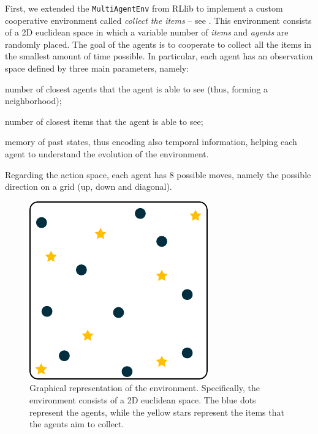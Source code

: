 \documentclass[sigconf]{acmart}
\begin{document}
First, we extended the \texttt{MultiAgentEnv} from RLlib to implement a custom cooperative environment 
  called \emph{collect the items} -- see .
%
This environment consists of a 2D euclidean space in which a variable number of \emph{items} and \emph{agents} 
 are randomly placed.
%
The goal of the agents is to cooperate to collect all the items in the smallest amount of time possible. 
%
In particular, each agent has an observation space defined by three main parameters, namely: 
\begin{enumerate*}[label=(\roman*)]
  \item number of closest agents that the agent is able to see (thus, forming a neighborhood);
  \item number of closest items that the agent is able to see;
  \item memory of past states, thus encoding also temporal information, helping each agent to understand 
    the evolution of the environment.
\end{enumerate*} 
%
Regarding the action space, each agent has $8$ possible moves, namely the possible direction on a grid 
  (up, down and diagonal).






\begin{figure}
  \centering
  \includegraphics[width=0.7\linewidth]{figures/env.pdf}
  \caption{Graphical representation of the environment. 
  Specifically, the environment consists of a 2D euclidean space.
  The blue dots represent the agents, while the yellow stars represent the items that 
  the agents aim to collect.
  }
  \label{fig:env}
\end{figure}
\end{document}
